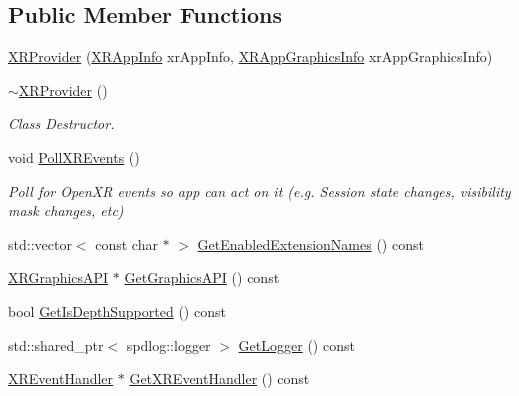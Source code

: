 \subsection*{Public Member Functions}
\begin{DoxyCompactItemize}
\item 
\mbox{\hyperlink{class_open_x_r_provider_1_1_x_r_provider_ae4e2c14022b9db81c0c4090151976bcf}{X\+R\+Provider}} (\mbox{\hyperlink{struct_open_x_r_provider_1_1_x_r_app_info}{X\+R\+App\+Info}} xr\+App\+Info, \mbox{\hyperlink{struct_open_x_r_provider_1_1_x_r_app_graphics_info}{X\+R\+App\+Graphics\+Info}} xr\+App\+Graphics\+Info)
\item 
\mbox{\hyperlink{class_open_x_r_provider_1_1_x_r_provider_a7bce537abed2b4a5ebb7c34f61ccaae8}{$\sim$\+X\+R\+Provider}} ()
\begin{DoxyCompactList}\small\item\em Class Destructor. \end{DoxyCompactList}\item 
void \mbox{\hyperlink{class_open_x_r_provider_1_1_x_r_provider_a1eb2fce148d5ab2d3399235c23131808}{Poll\+X\+R\+Events}} ()
\begin{DoxyCompactList}\small\item\em Poll for Open\+XR events so app can act on it (e.\+g. Session state changes, visibility mask changes, etc) \end{DoxyCompactList}\item 
std\+::vector$<$ const char $\ast$ $>$ \mbox{\hyperlink{class_open_x_r_provider_1_1_x_r_provider_a036e87ad498dc8e9b556dbba3499bf9a}{Get\+Enabled\+Extension\+Names}} () const
\item 
\mbox{\hyperlink{class_open_x_r_provider_1_1_x_r_graphics_a_p_i}{X\+R\+Graphics\+A\+PI}} $\ast$ \mbox{\hyperlink{class_open_x_r_provider_1_1_x_r_provider_aa88f602edaeecefe0d3c1e5072a5f4fc}{Get\+Graphics\+A\+PI}} () const
\item 
bool \mbox{\hyperlink{class_open_x_r_provider_1_1_x_r_provider_a20c6d026a126738127ed300039ff72e1}{Get\+Is\+Depth\+Supported}} () const
\item 
std\+::shared\+\_\+ptr$<$ spdlog\+::logger $>$ \mbox{\hyperlink{class_open_x_r_provider_1_1_x_r_provider_a985813ed6da86367d311836533466f7b}{Get\+Logger}} () const
\item 
\mbox{\hyperlink{class_open_x_r_provider_1_1_x_r_event_handler}{X\+R\+Event\+Handler}} $\ast$ \mbox{\hyperlink{class_open_x_r_provider_1_1_x_r_provider_a86abca051fdf068a7f4a0e4d8f57095e}{Get\+X\+R\+Event\+Handler}} () const

\end{DoxyCompactItemize}
